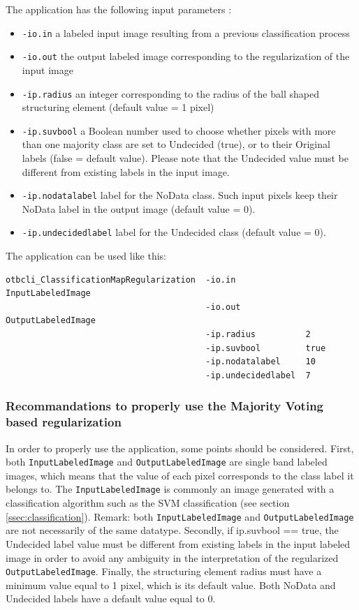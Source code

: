 The  application has the following input parameters :
\begin{itemize}
\item \verb?-io.in? a labeled input image resulting from a previous classification process
\item \verb?-io.out? the output labeled image corresponding to the regularization of the input image
\item \verb?-ip.radius? an integer corresponding to the radius of the ball shaped structuring element (default value = 1 pixel)
\item \verb?-ip.suvbool? a Boolean number used to choose whether pixels with more than one majority class are set to Undecided (true),
or to their Original labels (false = default value). Please note that the Undecided value must be different from existing labels in the input image.
\item \verb?-ip.nodatalabel? label for the NoData class. Such input pixels keep their NoData label in the output image (default value = 0).
\item \verb?-ip.undecidedlabel? label for the Undecided class (default value = 0).
\end{itemize}



The application can be used like this:
\begin{verbatim}
otbcli_ClassificationMapRegularization  -io.in              InputLabeledImage
                                        -io.out             OutputLabeledImage
                                        -ip.radius          2
                                        -ip.suvbool         true
                                        -ip.nodatalabel     10
                                        -ip.undecidedlabel  7
\end{verbatim}
 

\subsubsection{Recommandations to properly use the Majority Voting based regularization}

In order to properly use the  application, some points should be considered.
First, both \verb?InputLabeledImage? and \verb?OutputLabeledImage? are single band labeled images, which means that the
value of each pixel corresponds to the class label it belongs to. The \verb?InputLabeledImage? is commonly an image generated
with a classification algorithm such as the SVM classification (see section \ref{ssec:classification}). Remark: both
\verb?InputLabeledImage? and \verb?OutputLabeledImage? are not necessarily of the same datatype. Secondly, if ip.suvbool == true,
the Undecided label value must be different from existing labels in the input labeled image in order to avoid any ambiguity in the
interpretation of the regularized \verb?OutputLabeledImage?. Finally, the structuring element radius must have a minimum value equal to 1 pixel,
which is its default value. Both NoData and Undecided labels have a default value equal to 0.


